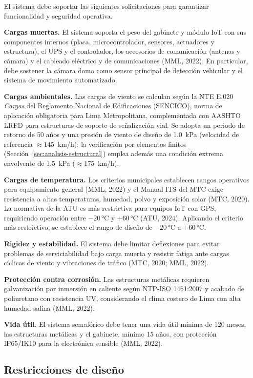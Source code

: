El sistema debe soportar las siguientes solicitaciones para garantizar funcionalidad y seguridad operativa.

\textbf{Cargas muertas.} El sistema soporta el peso del gabinete y módulo IoT con sus componentes internos (placa, microcontrolador, sensores, actuadores y estructura), el UPS y el controlador, los accesorios de comunicación (antenas y cámara) y el cableado eléctrico y de comunicaciones (MML, 2022). En particular, debe sostener la cámara domo como sensor principal de detección vehicular y el sistema de movimiento automatizado.

\textbf{Cargas ambientales.} Las cargas de viento se calculan según la NTE E.020 \emph{Cargas} del Reglamento Nacional de Edificaciones (SENCICO), norma de aplicación obligatoria para Lima Metropolitana, complementada con AASHTO LRFD para estructuras de soporte de señalización vial. Se adopta un periodo de retorno de 50 años y una presión de viento de diseño de 1.0~kPa (velocidad de referencia $\approx 145$~km/h); la verificación por elementos finitos (Sección~\ref{sec:analisis-estructural}) emplea además una condición extrema envolvente de 1.5~kPa ($\approx 175$~km/h).

\textbf{Cargas de temperatura.} Los criterios municipales establecen rangos operativos para equipamiento general (MML, 2022) y el Manual ITS del MTC exige resistencia a altas temperaturas, humedad, polvo y exposición solar (MTC, 2020). La normativa de la ATU es más restrictiva para equipos IoT con GPS, requiriendo operación entre $-20$\,°C y $+60$\,°C (ATU, 2024). Aplicando el criterio más restrictivo, se establece el rango de diseño de $-20$\,°C a $+60$\,°C.

\textbf{Rigidez y estabilidad.} El sistema debe limitar deflexiones para evitar problemas de serviciabilidad bajo carga muerta y resistir fatiga ante cargas cíclicas de viento y vibraciones de tráfico (MTC, 2020; MML, 2022).

\textbf{Protección contra corrosión.} Las estructuras metálicas requieren galvanización por inmersión en caliente según NTP-ISO 1461:2007 y acabado de poliuretano con resistencia UV, considerando el clima costero de Lima con alta humedad salina (MML, 2022).

\textbf{Vida útil.} El sistema semafórico debe tener una vida útil mínima de 120 meses; las estructuras metálicas y el gabinete, mínimo 15 años, con protección IP65/IK10 para la electrónica sensible (MML, 2022).

\subsection{Restricciones de diseño}\label{subsec:restricciones-diseno}


